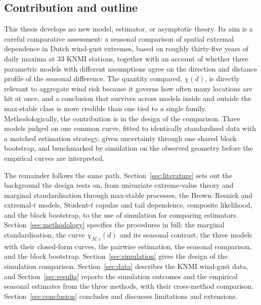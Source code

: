 \subsection{Contribution and outline}\label{sec:intro-contribution}\label{sec:intro-outline}

This thesis develops no new model, estimator, or asymptotic theory. Its aim is a careful comparative assessment: a seasonal comparison of spatial extremal dependence in Dutch wind-gust extremes, based on roughly thirty-five years of daily maxima at \(33\) KNMI stations, together with an account of whether three parametric models with different assumptions agree on the direction and distance profile of the seasonal difference. The quantity compared, \(\chi(d)\), is directly relevant to aggregate wind risk because it governs how often many locations are hit at once, and a conclusion that survives across models inside and outside the max-stable class is more credible than one tied to a single family. Methodologically, the contribution is in the design of the comparison. Three models judged on one common curve, fitted to identically standardised data with a matched estimation strategy, given uncertainty through one shared block bootstrap, and benchmarked by simulation on the observed geometry before the empirical curves are interpreted.

The remainder follows the same path. Section~\ref{sec:literature} sets out the background the design rests on, from univariate extreme-value theory and marginal standardisation through max-stable processes, the Brown--Resnick and extremal-\(t\) models, Student-\(t\) copulas and tail dependence, composite likelihood, and the block bootstrap, to the use of simulation for comparing estimators. Section~\ref{sec:methodology} specifies the procedures in full: the marginal standardisation, the curve \(\chi_{M,c}(d)\) and its seasonal contrast, the three models with their closed-form curves, the pairwise estimation, the seasonal comparison, and the block bootstrap. Section~\ref{sec:simulation} gives the design of the simulation comparison. Section~\ref{sec:data} describes the KNMI wind-gust data, and Section~\ref{sec:results} reports the simulation outcomes and the empirical seasonal estimates from the three methods, with their cross-method comparison. Section~\ref{sec:conclusion} concludes and discusses limitations and extensions.